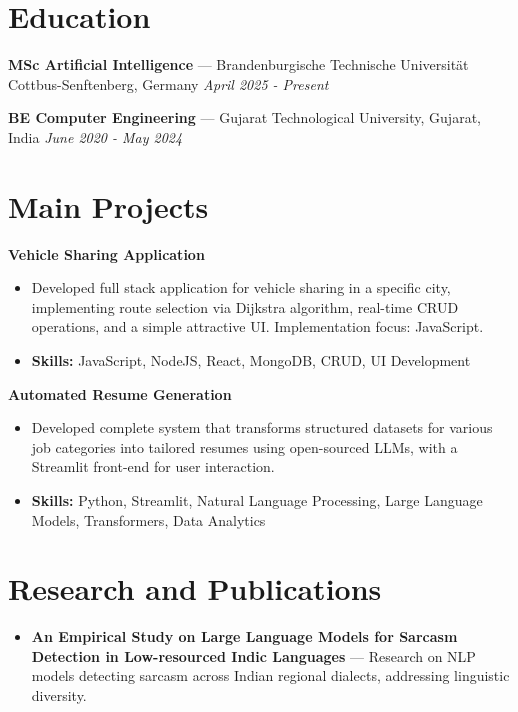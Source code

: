 \documentclass[a4paper,10pt]{article}
\begin{document}
\section*{Education}
\textbf{MSc Artificial Intelligence} — Brandenburgische Technische Universität Cottbus-Senftenberg, Germany \hfill \textit{April 2025 - Present}\par
\vspace{1.5pt}
\textbf{BE Computer Engineering} — Gujarat Technological University, Gujarat, India \hfill \textit{June 2020 - May 2024}\par

\section*{Main Projects}
\textbf{Vehicle Sharing Application}\par
\vspace{1pt}
\begin{itemize}
  \item Developed full stack application for vehicle sharing in a specific city, implementing route selection via Dijkstra algorithm, real-time CRUD operations, and a simple attractive UI. Implementation focus: JavaScript.
  \item \textbf{Skills:} JavaScript, NodeJS, React, MongoDB, CRUD, UI Development
\end{itemize}
\vspace{3pt}
\textbf{Automated Resume Generation}\par
\vspace{1pt}
\begin{itemize}
  \item Developed complete system that transforms structured datasets for various job categories into tailored resumes using open-sourced LLMs, with a Streamlit front-end for user interaction.
  \item \textbf{Skills:} Python, Streamlit, Natural Language Processing, Large Language Models, Transformers, Data Analytics
\end{itemize}

\section*{Research and Publications}
\begin{itemize}
\item \textbf{An Empirical Study on Large Language Models for Sarcasm Detection in Low-resourced Indic Languages} — Research on NLP models detecting sarcasm across Indian regional dialects, addressing linguistic diversity.
\end{itemize}
\end{document}
